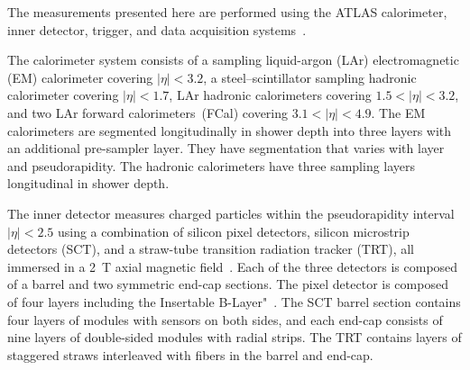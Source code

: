 
The measurements presented here are performed using the ATLAS calorimeter, inner detector, trigger,
and data acquisition systems~\cite{Aad:2008zzm}. 

The calorimeter system consists of a sampling liquid-argon (LAr) electromagnetic (EM) calorimeter covering $|\eta|<3.2$, a
steel--scintillator sampling hadronic calorimeter covering $|\eta| <1.7$, LAr hadronic calorimeters covering $1.5 < |\eta| < 3.2$, and
two LAr forward calorimeters~(FCal) covering $3.1 < |\eta| <
4.9$. 
The EM calorimeters are segmented longitudinally in shower depth into three
layers with an additional pre-sampler layer. They
have segmentation that varies with layer and pseudorapidity. 
The hadronic calorimeters have three sampling layers longitudinal
in shower depth.

The inner detector measures charged particles  within the pseudorapidity interval  $|\eta|<2.5$ using a combination of silicon pixel detectors, silicon microstrip detectors (SCT), and a straw-tube transition radiation tracker (TRT), all immersed in a 2~T axial magnetic field~\cite{Aad:2008zzm}. Each of the three detectors is composed of a barrel and two symmetric end-cap sections. The pixel detector is composed of four layers including the Insertable B-Layer"~\cite{ibl1,ibl2}. The SCT barrel section contains four layers of modules with sensors on both sides, and each end-cap consists of nine layers of double-sided modules with radial strips. The TRT contains layers of staggered straws interleaved with fibers in the barrel and end-cap.



